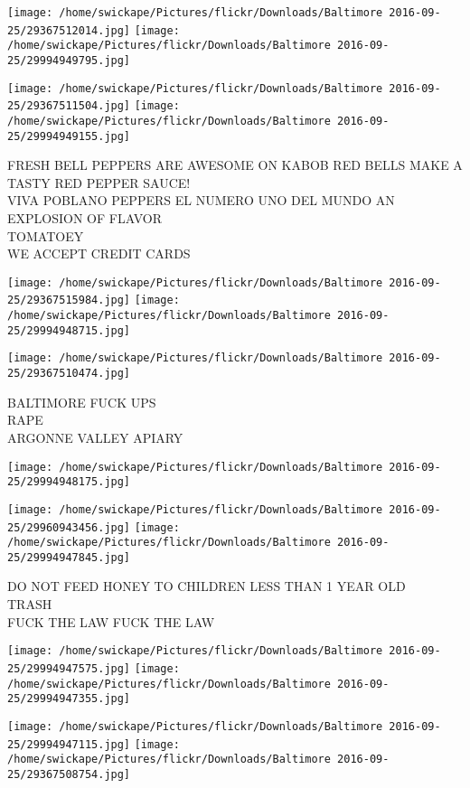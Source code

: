 \documentclass[10pt,letterpaper]{article}
\begin{document}
\texttt{[image: /home/swickape/Pictures/flickr/Downloads/Baltimore 2016-09-25/29367512014.jpg]}
\texttt{[image: /home/swickape/Pictures/flickr/Downloads/Baltimore 2016-09-25/29994949795.jpg]}

\texttt{[image: /home/swickape/Pictures/flickr/Downloads/Baltimore 2016-09-25/29367511504.jpg]}
\texttt{[image: /home/swickape/Pictures/flickr/Downloads/Baltimore 2016-09-25/29994949155.jpg]}

FRESH BELL PEPPERS ARE AWESOME ON KABOB RED BELLS MAKE A TASTY RED PEPPER SAUCE!\\
VIVA POBLANO PEPPERS EL NUMERO UNO DEL MUNDO AN EXPLOSION OF FLAVOR\\
TOMATOEY\\
WE ACCEPT CREDIT CARDS\\
\pagebreak

\texttt{[image: /home/swickape/Pictures/flickr/Downloads/Baltimore 2016-09-25/29367515984.jpg]}
\texttt{[image: /home/swickape/Pictures/flickr/Downloads/Baltimore 2016-09-25/29994948715.jpg]}

\texttt{[image: /home/swickape/Pictures/flickr/Downloads/Baltimore 2016-09-25/29367510474.jpg]}

BALTIMORE FUCK UPS\\
RAPE\\
ARGONNE VALLEY APIARY\\
\pagebreak

\texttt{[image: /home/swickape/Pictures/flickr/Downloads/Baltimore 2016-09-25/29994948175.jpg]}

\vspace{0.25in}
\texttt{[image: /home/swickape/Pictures/flickr/Downloads/Baltimore 2016-09-25/29960943456.jpg]}
\texttt{[image: /home/swickape/Pictures/flickr/Downloads/Baltimore 2016-09-25/29994947845.jpg]}

DO NOT FEED HONEY TO CHILDREN LESS THAN 1 YEAR OLD\\
TRASH\\
FUCK THE LAW FUCK THE LAW\\
\pagebreak

\texttt{[image: /home/swickape/Pictures/flickr/Downloads/Baltimore 2016-09-25/29994947575.jpg]}
\texttt{[image: /home/swickape/Pictures/flickr/Downloads/Baltimore 2016-09-25/29994947355.jpg]}

\texttt{[image: /home/swickape/Pictures/flickr/Downloads/Baltimore 2016-09-25/29994947115.jpg]}
\texttt{[image: /home/swickape/Pictures/flickr/Downloads/Baltimore 2016-09-25/29367508754.jpg]}
\end{document}
